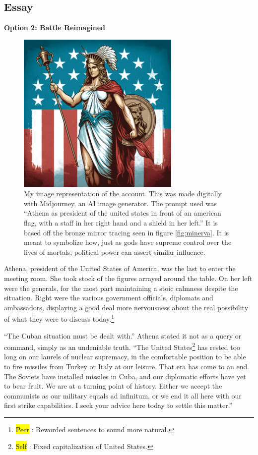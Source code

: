 \documentclass[letterpaper, reqno,11pt]{article}
\newcommand{\hlc}[2][yellow]{{%
    \colorlet{foo}{#1}%
    \sethlcolor{foo}\hl{#2}}%
}
\begin{document}
\subsection*{Essay}

{\bf Option 2: Battle Reimagined}

\begin{figure}[h!]
  \centering
  \includegraphics[width=0.7\textwidth]{im-athena}
  \caption{My image representation of the account. This was made digitally with Midjourney, an AI image generator. The prompt used was ``Athena as president of the united states in front of an american flag, with a staff in her right hand and a shield in her left.'' It is based off the bronze mirror tracing seen in figure \ref{fig:minerva}. It is meant to symbolize how, just as gods have supreme control over the lives of mortals, political power can assert similar influence.}
  \label{fig:im-athena}
\end{figure}

Athena, president of the United States of America, was the last to enter the meeting room. She took stock of the figures arrayed around the table. On her left were the generals, for the most part maintaining a stoic calmness despite the situation. Right were the various government officials, diplomats and ambassadors, displaying a good deal more nervousness about the real possibility of what they were to discuss today.\footnote{\hlc[BurntOrange]{Peer}: Reworded sentences to sound more natural.}

``The Cuban situation must be dealt with.'' Athena stated it not as a query or command, simply as an undeniable truth. ``The United States\footnote{\hlc[pink]{Self}: Fixed capitalization of United States.} has rested too long on our laurels of nuclear supremacy, in the comfortable position to be able to fire missiles from Turkey or Italy at our leisure. That era has come to an end. The Soviets have installed missiles in Cuba, and our diplomatic efforts have yet to bear fruit. We are at a turning point of history. Either we accept the communists as our military equals ad infinitum, or we end it all here with our first strike capabilities. I seek your advice here today to settle this matter.''
\end{document}
